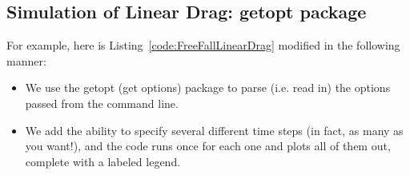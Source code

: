 \subsection{Simulation of Linear Drag: \textsf{getopt} package}
\label{sec-LinDragGetOpt}

For example, here is Listing~\ref{code:FreeFallLinearDrag} modified in the following manner: 
\begin{itemize}
	\item We use the getopt (get options) package to parse (i.e. read in) the options passed from the command line.
	\item We add the ability to specify several different time steps (in fact, as many as you want!), and the code runs once for each one and plots all of them out, complete with a labeled legend.
\end{itemize}



